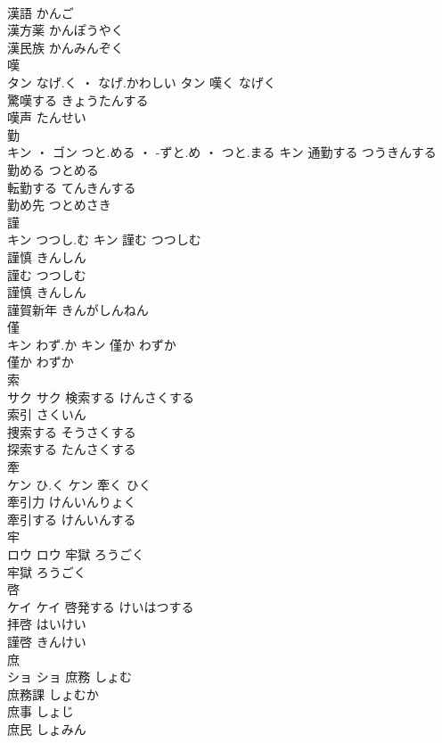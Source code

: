 \documentclass[8pt]{extreport}
\begin{document}
\begin{CJK}{UTF8}{min}
\\	漢語	かんご	
\\	漢方薬	かんぽうやく	
\\	漢民族	かんみんぞく	
\\	嘆	
\\	タン	なげ.く ・ なげ.かわしい	タン	嘆く	なげく	
\\	驚嘆する	きょうたんする	
\\	嘆声	たんせい	
\\	勤	
\\	キン ・ ゴン	つと.める ・ -ずと.め ・ つと.まる	キン	通勤する	つうきんする	
\\	勤める	つとめる	
\\	転勤する	てんきんする	
\\	勤め先	つとめさき	
\\	謹	
\\	キン	つつし.む	キン	謹む	つつしむ	
\\	謹慎	きんしん	
\\	謹む	つつしむ	
\\	謹慎	きんしん	
\\	謹賀新年	きんがしんねん	
\\	僅	
\\	キン	わず.か	キン	僅か	わずか	
\\	僅か	わずか	
\\	索	
\\	サク		サク	検索する	けんさくする	
\\	索引	さくいん	
\\	捜索する	そうさくする	
\\	探索する	たんさくする	
\\	牽	
\\	ケン	ひ.く	ケン	牽く	ひく	
\\	牽引力	けんいんりょく	
\\	牽引する	けんいんする	
\\	牢	
\\	ロウ		ロウ	牢獄	ろうごく	
\\	牢獄	ろうごく	
\\	啓	
\\	ケイ		ケイ	啓発する	けいはつする	
\\	拝啓	はいけい	
\\	謹啓	きんけい	
\\	庶	
\\	ショ		ショ	庶務	しょむ	
\\	庶務課	しょむか	
\\	庶事	しょじ	
\\	庶民	しょみん	

\end{CJK}
\end{document}
